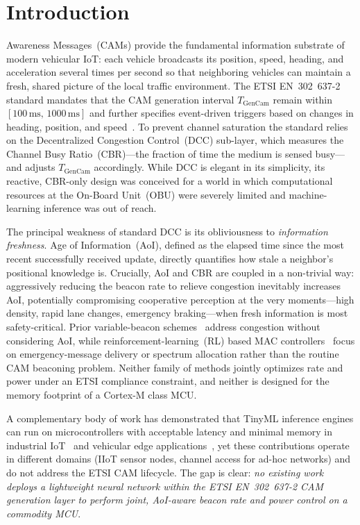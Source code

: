 \documentclass[journal]{IEEEtran}
\begin{document}
\section{Introduction}
\label{sec:introduction}

 Awareness Messages~(CAMs) provide the
fundamental information substrate of modern vehicular IoT: each vehicle
broadcasts its position, speed, heading, and acceleration several
times per second so that neighboring vehicles can maintain a fresh,
shared picture of the local traffic environment.  The ETSI
EN~302~637-2 standard mandates that the CAM generation interval
$T_{\text{GenCam}}$ remain within $[100\,\text{ms},\,1000\,\text{ms}]$
and further specifies event-driven triggers based on changes in
heading, position, and speed~\cite{Bhattacharyya2024}.  To prevent
channel saturation the standard relies on the Decentralized Congestion
Control~(DCC) sub-layer, which measures the Channel Busy
Ratio~(CBR)---the fraction of time the medium is sensed busy---and
adjusts $T_{\text{GenCam}}$ accordingly.  While DCC is elegant in its
simplicity, its reactive, CBR-only design was conceived for a world in
which computational resources at the On-Board Unit~(OBU) were severely
limited and machine-learning inference was out of reach.

The principal weakness of standard DCC is its obliviousness to
\emph{information freshness}.  Age of Information~(AoI), defined
as the elapsed time since the most recent successfully received update,
directly quantifies how stale a neighbor's positional knowledge is.
Crucially, AoI and CBR are coupled in a non-trivial way: aggressively
reducing the beacon rate to relieve congestion inevitably increases
AoI, potentially compromising cooperative perception at the very
moments---high density, rapid lane changes, emergency braking---when
fresh information is most safety-critical.  Prior variable-beacon
schemes~\cite{Bhattacharyya2024} address congestion without
considering AoI, while reinforcement-learning~(RL) based MAC
controllers~\cite{Wu2025,Iqbal2025} focus on emergency-message
delivery or spectrum allocation rather than the routine CAM beaconing
problem.  Neither family of methods jointly optimizes rate and power
under an ETSI compliance constraint, and neither is designed for the
memory footprint of a Cortex-M class MCU.

A complementary body of work has demonstrated that TinyML inference
engines can run on microcontrollers with acceptable latency and minimal
memory in industrial IoT~\cite{Zila2026} and vehicular edge
applications~\cite{Ni2024,Wang2024}, yet these contributions operate
in different domains (IIoT sensor nodes, channel access for ad-hoc
networks) and do not address the ETSI CAM lifecycle.  The gap is clear:
\emph{no existing work deploys a lightweight neural network within the
ETSI EN~302~637-2 CAM generation layer to perform joint, AoI-aware
beacon rate and power control on a commodity MCU}.
\end{document}
